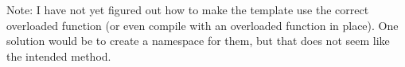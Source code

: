 Note: I have not yet figured out how to make the template use the correct overloaded function (or even compile with an overloaded function in place). One solution would be to create a namespace for them, but that does not seem like the intended method.

